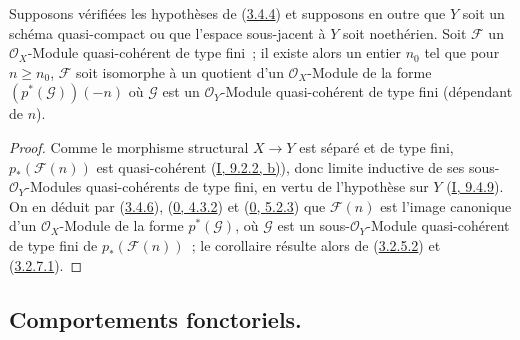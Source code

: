 \begin{corollary}[3.4.8]
\label{II.3.4.8-fr}
Supposons vérifiées les hypothèses de (\hyperref[II.3.4.4-fr]{3.4.4}) et
supposons en outre que $Y$ soit un schéma quasi-compact ou que l'espace
sous-jacent à $Y$ soit noethérien. Soit $\mathcal{F}$ un
$\mathcal{O}_X$-Module quasi-cohérent de type fini~; il existe alors un entier
$n_0$ tel que pour $n\geq n_0$, $\mathcal{F}$ soit isomorphe à un quotient
d'un $\mathcal{O}_X$-Module de la forme $(p^*(\mathcal{G}))(-n)$ où
$\mathcal{G}$ est un $\mathcal{O}_Y$-Module quasi-cohérent de type fini
(dépendant de $n$).
\end{corollary}

\begin{proof}
Comme le morphisme structural $X\to Y$ est séparé et de type fini,
$p_*(\mathcal{F}(n))$ est quasi-cohérent
(\hyperref[I.9.2.2-fr]{I, 9.2.2, b)}), donc limite inductive de ses
sous-$\mathcal{O}_Y$-Modules quasi-cohérents de type fini, en vertu de
l'hypothèse sur $Y$ (\hyperref[I.9.4.9-fr]{I, 9.4.9}). On en déduit par
(\hyperref[II.3.4.6-fr]{3.4.6}),
(\hyperref[0.4.3.2-fr]{0, 4.3.2}) et
(\hyperref[0.5.2.3-fr]{0, 5.2.3}) que $\mathcal{F}(n)$ est l'image canonique
d'un $\mathcal{O}_X$-Module de la forme $p^*(\mathcal{G})$, où $\mathcal{G}$
est un sous-$\mathcal{O}_Y$-Module quasi-cohérent de type fini de
$p_*(\mathcal{F}(n))$~; le corollaire résulte alors de
(\hyperref[II.3.2.5.2-fr]{3.2.5.2}) et
(\hyperref[II.3.2.7.1-fr]{3.2.7.1}).
\end{proof}

\subsection{Comportements fonctoriels.}
\label{subsection:II.3.5-fr}

